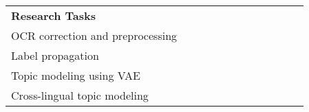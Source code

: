 \begin{table}
{\begin{tabular}{l|llclllcllll}
\textbf{Research Tasks}               &                                        &                                        &                                        &                                        &                                        &                                        &                                       &                                        &                                        &                                        &                               \\
OCR correction and preprocessing      &                                        &                                        & {\cellcolor[rgb]{0.204,1,0.204}}       & {\cellcolor[rgb]{0.204,1,0.204}}       &                                        &                                        &                                       &                                        &                                        &                                        &                               \\
Label propagation                     &                                        &                                        &                                        &                                        & {\cellcolor[rgb]{0.204,1,0.204}}       & {\cellcolor[rgb]{0.204,1,0.204}}       &                                       &                                        &                                        &                                        &                               \\
Topic modeling using VAE              &                                        &                                        &                                        &                                        &                                        & {\cellcolor[rgb]{0.204,1,0.204}}       & {\cellcolor[rgb]{0.204,1,0.204}}      &                                        &                                        &                                        &                               \\
Cross-lingual topic modeling          &                                        &                                        &                                        &                                        &                                        &                                        &                                       & {\cellcolor[rgb]{0.204,1,0.204}}       & {\cellcolor[rgb]{0.204,1,0.204}}       & {\cellcolor[rgb]{0.204,1,0.204}}       &                               \\

\end{tabular}}
\end{table}
